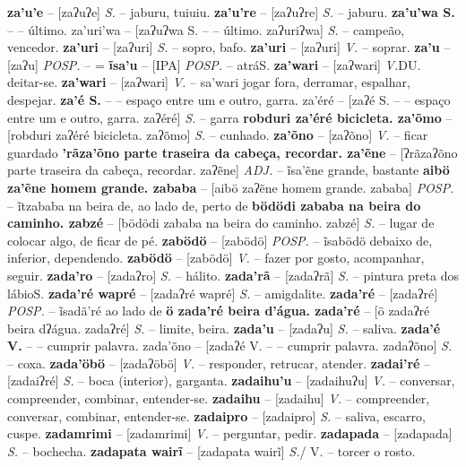 {{{{{{{{{{{{{{\textbf{za'u'e} -- [zaʔuʔe] \textit{S.} -- jaburu, tuiuiu.
\textbf{za'u're} -- [zaʔuʔre] \textit{S.} -- jaburu.
\textbf{za'u'wa S.} -- -- último. za'uri'wa} -- [zaʔuʔwa S.} -- -- último. zaʔuriʔwa] \textit{S.} -- campeão, vencedor.
\textbf{za'uri} -- [zaʔuri] \textit{S.} -- sopro, bafo.
\textbf{za'uri} -- [zaʔuri] \textit{V.} -- soprar.
\textbf{za'u} -- [zaʔu] \textit{POSP.} -- =
\textbf{ĩsa'u} -- [IPA] \textit{POSP.} -- atráS.}
\textbf{za'wari} -- [zaʔwari] \textit{V.}DU. deitar-se.
\textbf{za'wari} -- [zaʔwari] \textit{V.} -- sa'wari jogar fora, derramar, espalhar, despejar.
\textbf{za'é S.} -- -- espaço entre um e outro, garra. za'éré} -- [zaʔé S.} -- -- espaço entre um e outro, garra. zaʔéré] \textit{S.} -- garra
\textbf{robduri za'éré bicicleta. za'õmo} -- [robduri zaʔéré bicicleta. zaʔõmo] \textit{S.} -- cunhado.
\textbf{za'õno} -- [zaʔõno] \textit{V.} -- ficar guardado
\textbf{'rãza'õno parte traseira da cabeça, recordar. za'ẽne} -- [ʔrãzaʔõno parte traseira da cabeça, recordar. zaʔẽne] \textit{ADJ.} -- ĩsa'ẽne grande, bastante
\textbf{aibö za'ẽne homem grande. zababa} -- [aibö zaʔẽne homem grande. zababa] \textit{POSP.} -- ĩtzababa na beira de, ao lado de, perto de
\textbf{bödödi zababa na beira do caminho. zabzé} -- [bödödi zababa na beira do caminho. zabzé] \textit{S.} -- lugar de colocar algo, de ficar de pé.
\textbf{zabödö} -- [zabödö] \textit{POSP.} -- ĩsabödö debaixo de, inferior, dependendo.
\textbf{zabödö} -- [zabödö] \textit{V.} -- fazer por gosto, acompanhar, seguir.
\textbf{zada'ro} -- [zadaʔro] \textit{S.} -- hálito.
\textbf{zada'rã} -- [zadaʔrã] \textit{S.} -- pintura preta dos lábioS.}
\textbf{zada'ré wapré} -- [zadaʔré wapré] \textit{S.} -- amigdalite.
\textbf{zada'ré} -- [zadaʔré] \textit{POSP.} -- ĩsadã'ré ao lado de
\textbf{ö zada'ré beira d'água. zada'ré} -- [ö zadaʔré beira dʔágua. zadaʔré] \textit{S.} -- limite, beira.
\textbf{zada'u} -- [zadaʔu] \textit{S.} -- saliva.
\textbf{zada'é V.} -- -- cumprir palavra. zada'õno} -- [zadaʔé V.} -- -- cumprir palavra. zadaʔõno] \textit{S.} -- coxa.
\textbf{zada'öbö} -- [zadaʔöbö] \textit{V.} -- responder, retrucar, atender.
\textbf{zadai'ré} -- [zadaiʔré] \textit{S.} -- boca (interior), garganta.
\textbf{zadaihu'u} -- [zadaihuʔu] \textit{V.} -- conversar, compreender, combinar, entender-se.
\textbf{zadaihu} -- [zadaihu] \textit{V.} -- compreender, conversar, combinar, entender-se.
\textbf{zadaipro} -- [zadaipro] \textit{S.} -- saliva, escarro, cuspe.
\textbf{zadamrimi} -- [zadamrimi] \textit{V.} -- perguntar, pedir.
\textbf{zadapada} -- [zadapada] \textit{S.} -- bochecha.
\textbf{zadapata wairĩ} -- [zadapata wairĩ] \textit{S.}/ V.} -- torcer o rosto.
}}}}}
